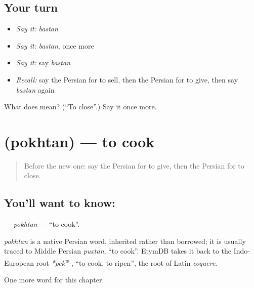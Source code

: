 \subsection*{Your turn}
\begin{itemize}
\raggedright
  \item \emph{Say it:} \emph{bastan}
  \item \emph{Say it:} \emph{bastan}, once more
  \item \emph{Say it:} say \emph{bastan}
  \item \emph{Recall:} say the Persian for to sell, then the Persian for to give, then say \emph{bastan} again
\end{itemize}

\begin{tcolorbox}[breakable,colback=teal!4,colframe=teal!35!black,title={Before you move on}]
What does  mean? (\textquotedblleft{}To close\textquotedblright{}.) Say it once more.
\end{tcolorbox}
\section[\texorpdfstring{\fa{پختن} (pokhtan)}{پختن (pokhtan)}]{ (pokhtan) — to cook}

\label{lesson:FA-C37-pokhtan}



\begin{quote}
Before the new one: say the Persian for to give, then the Persian for to close.
\end{quote}

\subsection*{You'll want to know: }
\textbf{} — \emph{pokhtan} — \textquotedblleft{}to cook\textquotedblright{}.

\begin{cousinweb}
\emph{pokhtan} is a native Persian word, inherited rather than borrowed; it is usually traced to Middle Persian \emph{puxtan}, \textquotedblleft{}to cook\textquotedblright{}. EtymDB takes it back to the Indo-European root \emph{*pek\textsuperscript{w}-}, \textquotedblleft{}to cook, to ripen\textquotedblright{}, the root of Latin \emph{coquere}.
\end{cousinweb}

\begin{grammarlens}[title={What you've built}]
One more word for this chapter.
\end{grammarlens}

